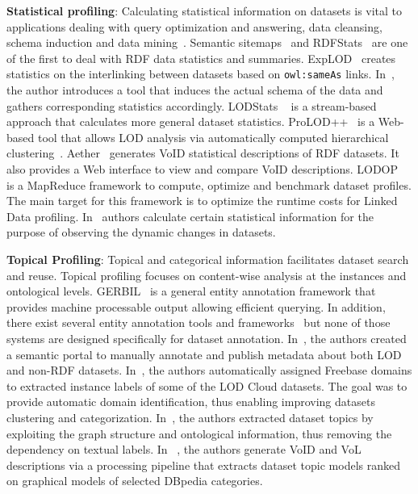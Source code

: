 \textbf{Statistical profiling}: Calculating statistical information on datasets is vital to applications dealing with query optimization and answering, data cleansing, schema induction and data mining~\cite{Jentzsch:ISWC:14,Frosterus:Springer:11,Lalithsena:WI:13}. Semantic sitemaps~\cite{Cyganiak:ESWC:08} and RDFStats~\cite{Lanegger:DEXA:09} are one of the first to deal with RDF data statistics and summaries. ExpLOD~\cite{Khatchadourian:ESWC:10} creates statistics on the interlinking between datasets based on \texttt{owl:sameAs} links. In~\cite{Li:WISM:12}, the author introduces a tool that induces the actual schema of the data and gathers corresponding statistics accordingly. LODStats ~\cite{Auer:EKAW:12} is a stream-based approach that calculates more general dataset statistics. ProLOD++~\cite{Abedjan:ICDE:14} is a Web-based tool that allows LOD analysis via automatically computed hierarchical clustering~\cite{Bohm:ICDEW:10}. Aether~\cite{Makela:ESWC:14} generates VoID statistical descriptions of RDF datasets. It also provides a Web interface to view and compare VoID descriptions. LODOP~\cite{Forchhammer:PROFILES:14} is a MapReduce framework to compute, optimize and benchmark dataset profiles. The main target for this framework is to optimize the runtime costs for Linked Data profiling. In~\cite{Kaafer:ESWC:13} authors calculate certain statistical information for the purpose of observing the dynamic changes in datasets.

\textbf{Topical Profiling}: Topical and categorical information facilitates dataset search and reuse. Topical profiling focuses on content-wise analysis at the instances and ontological levels. GERBIL~\cite{Usbeck:WWW:15} is a general entity annotation framework that provides machine processable output allowing efficient querying. In addition, there exist several entity annotation tools and frameworks~\cite{Cornolti:WWW:13} but none of those systems are designed specifically for dataset annotation. In~\cite{Frosterus:ESWC:11}, the authors created a semantic portal to manually annotate and publish metadata about both LOD and non-RDF datasets. In~\cite{Lalithsena:WI:13}, the authors automatically assigned Freebase domains to extracted instance labels of some of the LOD Cloud datasets. The goal was to provide automatic domain identification, thus enabling improving datasets clustering and categorization. In~\cite{Bohm:CIKM:12}, the authors extracted dataset topics by exploiting the graph structure and ontological information, thus removing the dependency on textual labels. In ~\cite{Fetahu:ESWC:14}, the authors generate VoID and VoL descriptions via a processing pipeline that extracts dataset topic models ranked on graphical models of selected DBpedia categories.

